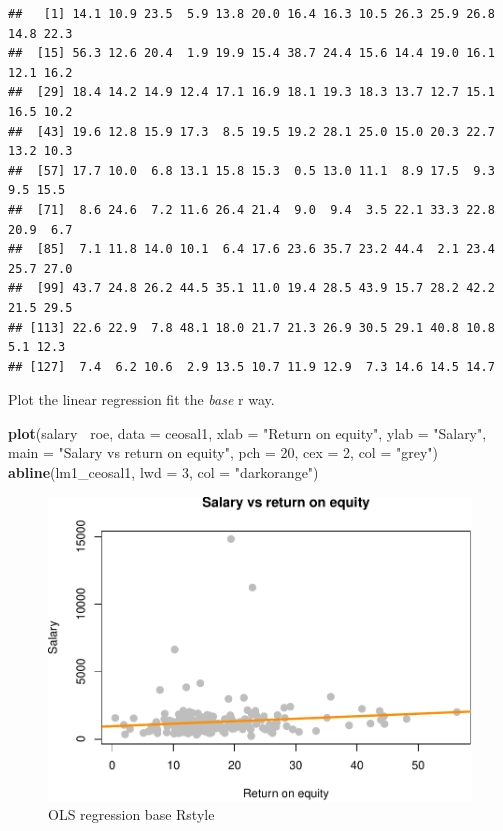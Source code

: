 \documentclass[]{book}
\newenvironment{Shaded}{\begin{snugshade}}{\end{snugshade}}
\newcommand{\DataTypeTok}[1]{\textcolor[rgb]{0.13,0.29,0.53}{#1}}
\newcommand{\DecValTok}[1]{\textcolor[rgb]{0.00,0.00,0.81}{#1}}
\newcommand{\KeywordTok}[1]{\textcolor[rgb]{0.13,0.29,0.53}{\textbf{#1}}}
\newcommand{\NormalTok}[1]{#1}
\newcommand{\OperatorTok}[1]{\textcolor[rgb]{0.81,0.36,0.00}{\textbf{#1}}}
\newcommand{\StringTok}[1]{\textcolor[rgb]{0.31,0.60,0.02}{#1}}
\begin{document}
\begin{verbatim}
##   [1] 14.1 10.9 23.5  5.9 13.8 20.0 16.4 16.3 10.5 26.3 25.9 26.8 14.8 22.3
##  [15] 56.3 12.6 20.4  1.9 19.9 15.4 38.7 24.4 15.6 14.4 19.0 16.1 12.1 16.2
##  [29] 18.4 14.2 14.9 12.4 17.1 16.9 18.1 19.3 18.3 13.7 12.7 15.1 16.5 10.2
##  [43] 19.6 12.8 15.9 17.3  8.5 19.5 19.2 28.1 25.0 15.0 20.3 22.7 13.2 10.3
##  [57] 17.7 10.0  6.8 13.1 15.8 15.3  0.5 13.0 11.1  8.9 17.5  9.3  9.5 15.5
##  [71]  8.6 24.6  7.2 11.6 26.4 21.4  9.0  9.4  3.5 22.1 33.3 22.8 20.9  6.7
##  [85]  7.1 11.8 14.0 10.1  6.4 17.6 23.6 35.7 23.2 44.4  2.1 23.4 25.7 27.0
##  [99] 43.7 24.8 26.2 44.5 35.1 11.0 19.4 28.5 43.9 15.7 28.2 42.2 21.5 29.5
## [113] 22.6 22.9  7.8 48.1 18.0 21.7 21.3 26.9 30.5 29.1 40.8 10.8  5.1 12.3
## [127]  7.4  6.2 10.6  2.9 13.5 10.7 11.9 12.9  7.3 14.6 14.5 14.7
\end{verbatim}

Plot the linear regression fit the \emph{base} r way.

\begin{Shaded}
\begin{Highlighting}[]
\KeywordTok{plot}\NormalTok{(salary}\OperatorTok{~}\StringTok{ }\NormalTok{roe, }\DataTypeTok{data =}\NormalTok{ ceosal1,}
     \DataTypeTok{xlab =} \StringTok{"Return on equity"}\NormalTok{,}
     \DataTypeTok{ylab =} \StringTok{"Salary"}\NormalTok{,}
     \DataTypeTok{main =} \StringTok{"Salary vs return on equity"}\NormalTok{,}
     \DataTypeTok{pch  =} \DecValTok{20}\NormalTok{,}
     \DataTypeTok{cex  =} \DecValTok{2}\NormalTok{,}
     \DataTypeTok{col  =} \StringTok{"grey"}\NormalTok{)}
\KeywordTok{abline}\NormalTok{(lm1_ceosal1, }\DataTypeTok{lwd =} \DecValTok{3}\NormalTok{, }\DataTypeTok{col =} \StringTok{"darkorange"}\NormalTok{)}
\end{Highlighting}
\end{Shaded}

\begin{figure}

{\centering \includegraphics[width=0.8\linewidth]{MEM5220_R_files/figure-latex/fig1-1} 

}

\caption{OLS regression base Rstyle}\label{fig:fig1}
\end{figure}
\end{document}
